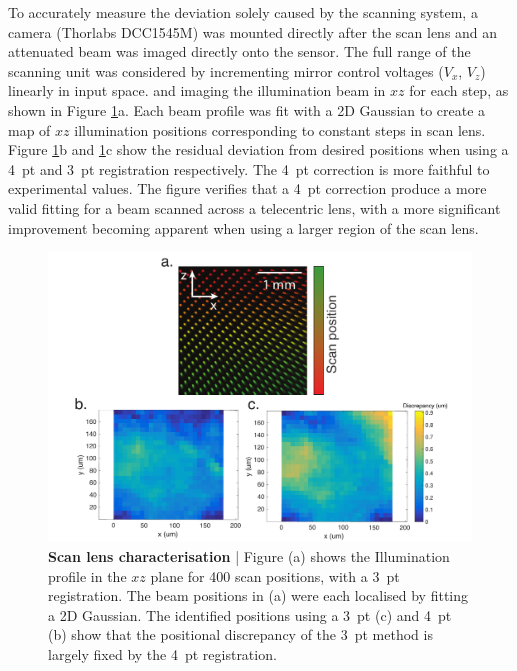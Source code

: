 To accurately measure the deviation solely caused by the scanning system, a camera (Thorlabs DCC1545M) was mounted directly after the scan lens and an attenuated beam was imaged directly onto the sensor.
The full range of the scanning unit was considered by incrementing mirror control voltages ($V_x$, $V_z$) linearly in input space.
and imaging the illumination beam in $xz$ for each step,
as shown in Figure \ref{fig:2}a.
Each beam profile was fit with a 2D Gaussian to create a map of $xz$ illumination positions corresponding to constant steps in scan lens.
Figure \ref{fig:2}b and \ref{fig:2}c show the residual deviation from desired positions when using a 4~pt and 3~pt registration respectively.
The 4~pt correction is more faithful to experimental values.
The figure verifies that a 4~pt correction %
produce a more valid fitting for a beam scanned across a telecentric lens, with a more significant improvement becoming apparent when using a larger region of the scan lens.

\begin{figure}
  \includegraphics[width=\columnwidth]{figure2}
  \caption{\textbf{Scan lens characterisation} | Figure (a) shows the Illumination profile in the $xz$ plane for 400 scan positions, %
  with a 3~pt registration.
  The beam positions in %
  (a) were each localised by fitting a 2D Gaussian.
  The identified positions %
  using a 3~pt (c) and 4~pt (b) %
  show that the positional discrepancy of the 3~pt method is largely fixed by the 4~pt registration.
  }
  \label{fig:2}
\end{figure}


